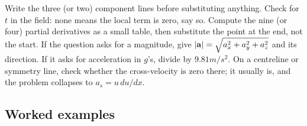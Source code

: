 \begin{firstmoves}
Write the three (or two) component lines before substituting anything. Check for $t$ in the field: none means the local term is zero, say so. Compute the nine (or four) partial derivatives as a small table, then substitute the point at the end, not the start. If the question asks for a magnitude, give $|\mathbf{a}| = \sqrt{a_x^2 + a_y^2 + a_z^2}$ and its direction. If it asks for acceleration in $g$'s, divide by $9.81\unit{m/s^2}$. On a centreline or symmetry line, check whether the cross-velocity is zero there; it usually is, and the problem collapses to $a_s = u\,du/dx$.
\end{firstmoves}

\subsection*{Worked examples}

